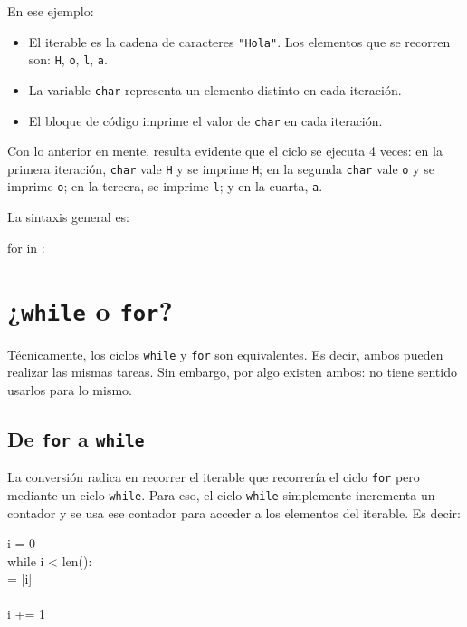 En ese ejemplo:
\begin{itemize}
    \item El iterable es la cadena de caracteres \texttt{"Hola"}. Los elementos que se recorren son: \texttt{H}, \texttt{o}, \texttt{l}, \texttt{a}.
    \item La variable \texttt{char} representa un elemento distinto en cada iteración.
    \item El bloque de código imprime el valor de \texttt{char} en cada iteración.
\end{itemize}
Con lo anterior en mente, resulta evidente que el ciclo se ejecuta 4 veces: en la primera iteración, \texttt{char} vale \texttt{H} y se imprime \texttt{H}; en la segunda \texttt{char} vale \texttt{o} y se imprime \texttt{o}; en la tercera, se imprime \texttt{l}; y en la cuarta, \texttt{a}.

La sintaxis general es:

\begin{sintaxis}
for  in :\\
\phantom{xxxx}
\end{sintaxis}

\section{¿\texttt{while} o \texttt{for}?}

Técnicamente, los ciclos \texttt{while} y \texttt{for} son equivalentes. Es decir, ambos pueden realizar las mismas tareas. Sin embargo, por algo existen ambos: no tiene sentido usarlos para lo mismo.

\subsection{De \texttt{for} a \texttt{while}}

La conversión radica en recorrer el iterable que recorrería el ciclo \texttt{for} pero mediante un ciclo \texttt{while}. Para eso, el ciclo \texttt{while} simplemente incrementa un contador y se usa ese contador para acceder a los elementos del iterable. Es decir:

\begin{sintaxis}
i = 0\\
while i < len():\\
\phantom{xxxx} = [i]\\
\phantom{xxxx}\\
\phantom{xxxx}i += 1
\end{sintaxis}

